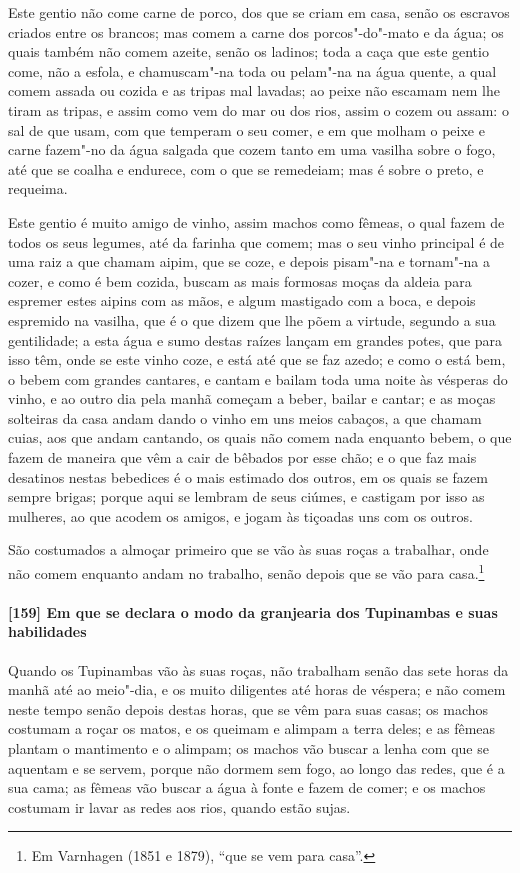 Este gentio não come carne de porco, dos que se criam em casa, senão os escravos criados
entre os brancos; mas comem a carne dos porcos"-do"-mato e da água; os quais também não
comem azeite, senão os ladinos; toda a caça que este gentio come, não a esfola, e
chamuscam"-na toda ou pelam"-na na água quente, a qual comem assada ou cozida e as tripas
mal lavadas; ao peixe não escamam nem lhe tiram as tripas, e assim como vem do mar ou dos
rios, assim o cozem ou assam: o sal de que usam, com que temperam o seu comer, e em que
molham o peixe e carne fazem"-no da água salgada que cozem tanto em uma vasilha sobre o
fogo, até que se coalha e endurece, com o que se remedeiam; mas é sobre o preto, e
requeima.

Este gentio é muito amigo de vinho, assim machos como fêmeas, o qual fazem de todos os
seus legumes, até da farinha que comem; mas o seu vinho principal é de uma raiz a que
chamam aipim, que se coze, e depois pisam"-na e tornam"-na a cozer, e como é bem cozida,
buscam as mais formosas moças da aldeia para espremer estes aipins com as mãos, e algum
mastigado com a boca, e depois espremido na vasilha, que é o que dizem que lhe põem a
virtude, segundo a sua gentilidade; a esta água e sumo destas raízes lançam em grandes
potes, que para isso têm, onde se este vinho coze, e está até que se faz azedo; e como o
está bem, o bebem com grandes cantares, e cantam e bailam toda uma noite às vésperas do
vinho, e ao outro dia pela manhã começam a beber, bailar e cantar; e as moças solteiras da
casa andam dando o vinho em uns meios cabaços, a que chamam cuias, aos que andam cantando,
os quais não comem nada enquanto bebem, o que fazem de maneira que vêm a cair de bêbados
por esse chão; e o que faz mais desatinos nestas bebedices é o mais estimado dos outros,
em os quais se fazem sempre brigas; porque aqui se lembram de seus ciúmes, e castigam por
isso as mulheres, ao que acodem os amigos, e jogam às tiçoadas uns com os outros.

São costumados a almoçar primeiro que se vão às suas roças a trabalhar, onde não comem
enquanto andam no trabalho, senão depois que se vão para casa.\footnote{ Em Varnhagen
(1851 e 1879), ``que se vem para casa''.}

\paragraph{[159] Em que se declara o modo da granjearia dos Tupinambas e suas habilidades}\quad
Quando os Tupinambas vão às suas roças, não trabalham senão das sete horas da manhã até ao
meio"-dia, e os muito diligentes até horas de véspera; e não comem neste tempo senão depois
destas horas, que se vêm para suas casas; os machos costumam a roçar os matos, e os
queimam e alimpam a terra deles; e as fêmeas plantam o mantimento e o alimpam; os machos
vão buscar a lenha com que se aquentam e se servem, porque não dormem sem fogo, ao longo
das redes, que é a sua cama; as fêmeas vão buscar a água à fonte e fazem de comer; e os
machos costumam ir lavar as redes aos rios, quando estão sujas.

